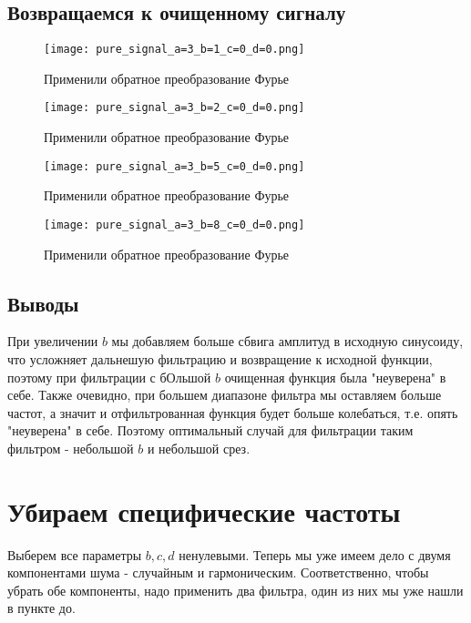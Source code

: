 \newpage
\subsection{Возвращаемся к очищенному сигналу}

\begin{figure}[ht]
    \centering
    \texttt{[image: pure\_signal\_a=3\_b=1\_c=0\_d=0.png]}
    \caption{Применили обратное преобразование Фурье}
\end{figure}

\begin{figure}[ht]
    \centering
    \texttt{[image: pure\_signal\_a=3\_b=2\_c=0\_d=0.png]}
    \caption{Применили обратное преобразование Фурье}
\end{figure}

\begin{figure}[ht]
    \centering
    \texttt{[image: pure\_signal\_a=3\_b=5\_c=0\_d=0.png]}
    \caption{Применили обратное преобразование Фурье}
\end{figure}

\begin{figure}[ht]
    \centering
    \texttt{[image: pure\_signal\_a=3\_b=8\_c=0\_d=0.png]}
    \caption{Применили обратное преобразование Фурье}
\end{figure}

\newpage
\subsection{Выводы}

При увеличении $b$ мы добавляем больше сбвига амплитуд в исходную синусоиду, что усложняет дальнешую фильтрацию и возвращение
 к исходной функции, поэтому при фильтрации с бОльшой $b$ очищенная функция была "неуверена" в себе.
Также очевидно, при большем диапазоне фильтра мы оставляем больше частот, а значит и отфильтрованная функция будет больше колебаться, т.е. опять "неуверена" в себе. Поэтому оптимальный случай для фильтрации таким фильтром - небольшой $b$ и небольшой срез.

\section{Убираем специфические частоты}

Выберем все параметры $b, c, d$ ненулевыми. Теперь мы уже имеем дело с двумя компонентами шума - случайным и гармоническим. Соответственно, чтобы убрать обе компоненты, надо применить два фильтра, один из них мы уже нашли в пункте до.
\newpage
